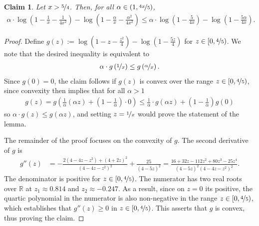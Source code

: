 \documentclass[11pt]{article}
\newtheorem{claim}{Claim}
\theoremstyle{definition}
\theoremstyle{plain}
\newcommand{\reals}{\mathbb{R}}
\begin{document}
\begin{claim}
    \label{claim:upper_bound_phi_bar}
    Let $x > \nicefrac{5}{4}$. Then, for all $\alpha \in (1, \nicefrac{4x}{5})$,
    \begin{align}
        \alpha \cdot \log\left(1 - \frac{1}{x} - \frac{1}{4x^2}\right) - \log\left(1 - \frac{\alpha}{x} - \frac{\alpha^2}{4x^2}\right) \leq \alpha \cdot \log\left(1 - \frac{5}{4x}\right) - \log\left(1 - \frac{5\alpha}{4x}\right).
    \end{align}
\end{claim}
\begin{proof}
Define \(g(z) := \log\left(1 - z - \frac{z^{2}}{4}\right) - \log\left(1 - \frac{5z}{4}\right)\) for \(z \in [0, \nicefrac{4}{5})\).
We note that the desired inequality is equivalent to
    \begin{align}
        \alpha \cdot g\left(\nicefrac{1}{x}\right) \leq g\left(\nicefrac{\alpha}{x}\right).
    \end{align}
    Since $g(0)  = 0$, the claim follows if $g(z)$ is convex over the range $z\in [0,\nicefrac{4}{5})$, since convexity then implies that for all $\alpha > 1$ 
    \begin{align}
        g(z) = g\left(\frac{1}{\alpha}(\alpha z) + \left(1 - \frac{1}{\alpha}\right)\cdot 0\right)  \leq \frac{1}{\alpha} \cdot g(\alpha z) + \left(1 - \frac{1}{\alpha}\right)g(0) 
    \end{align}
    so $\alpha\cdot g(z) \leq g(\alpha z)$, and setting \(z = \nicefrac{1}{x}\) would prove the statement of the lemma.
    
    The remainder of the proof focuses on the convexity of \(g\).
    The second derivative of \(g\) is
    \begin{align}
        g''(z) &= -\frac{2\left(4 - 4z - z^2\right) + (4+2z)^2}{\left(4 - 4z - z^2\right)^2} + \frac{25}{\left(4-5z\right)^2} = \frac{16 + 32z - 112z^2 + 80z^3 - 25z^4}{(4 - 5z)^2(4 - 4z - z^2)^2}.
    \end{align}
    The denominator is positive for \(z \in [0, \nicefrac{4}{5})\).
    The numerator has two real roots over \(\reals\) at \(z_{1} \approx 0.814\) and \(z_{2} \approx -0.247\).
    As a result, since on $z=0$ its positive, the quartic polynomial in the numerator is also non-negative in the range \(z \in [0, \nicefrac{4}{5})\), which establishes that \(g''(z) \geq 0\) in \(z \in [0, \nicefrac{4}{5})\).
    This asserts that \(g\) is convex, thus proving the claim.
\end{proof}
\end{document}
